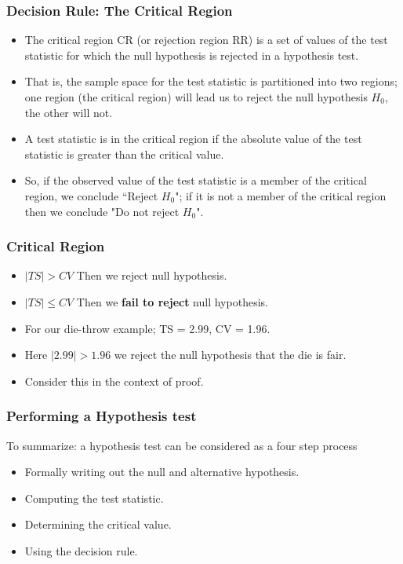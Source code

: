 
\begin{frame}
\frametitle{Decision Rule:  The Critical Region}
\begin{itemize}
\item The critical region CR (or rejection region RR) is a set of values of the test statistic for which the null hypothesis is rejected in a hypothesis test. \item That is, the sample space for the test statistic is partitioned into two regions; one region (the critical region) will lead us to reject the null hypothesis $H_0$, the other will not.

\item A test statistic is in the critical region if the absolute value of the test statistic is greater than the critical value.
    \item So, if the observed value of the test statistic is a member of the critical region, we conclude ``Reject $H_0$"; if it is not a member of the critical region then we conclude "Do not reject $H_0$".
\end{itemize}
\end{frame}


\begin{frame}
\frametitle{Critical Region}
\begin{itemize}

\item $|TS| > CV$ Then we reject null hypothesis.
\item $|TS| \leq CV$ Then we \textbf{fail to reject} null hypothesis.

\item For our die-throw example; TS = 2.99, CV = 1.96.
\item Here $|2.99| > 1.96$ we reject the null hypothesis that the die is fair.
\item Consider this in the context of proof.
\end{itemize}
\end{frame}


\begin{frame}
\frametitle{Performing a Hypothesis test}
To summarize: a hypothesis test can be considered as a four step process
\begin{itemize}
\item Formally writing out the null and alternative hypothesis.
\item Computing the test statistic.
\item Determining the critical value.
\item Using the decision rule.
\end{itemize}
\end{frame}
